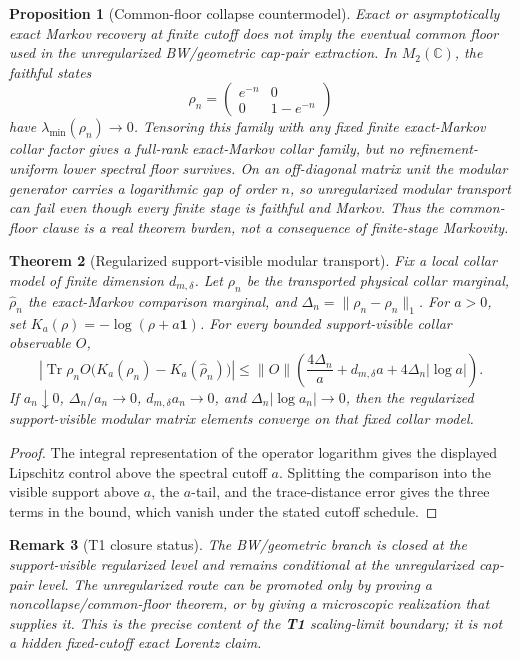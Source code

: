 \documentclass[11pt]{article}
\newtheorem{theorem}{Theorem}[section]
\newtheorem{proposition}[theorem]{Proposition}
\newtheorem{remark}[theorem]{Remark}
\begin{document}
\begin{proposition}[Common-floor collapse countermodel]\label{prop:commonfloor-collapse}
Exact or asymptotically exact Markov recovery at finite cutoff does not imply the eventual common floor used in the unregularized BW/geometric cap-pair extraction. In \(M_2(\mathbb C)\), the faithful states
\[
\rho_n=\begin{pmatrix}e^{-n}&0\\0&1-e^{-n}\end{pmatrix}
\]
have \(\lambda_{\min}(\rho_n)\to0\). Tensoring this family with any fixed finite exact-Markov collar factor gives a full-rank exact-Markov collar family, but no refinement-uniform lower spectral floor survives. On an off-diagonal matrix unit the modular generator carries a logarithmic gap of order \(n\), so unregularized modular transport can fail even though every finite stage is faithful and Markov. Thus the common-floor clause is a real theorem burden, not a consequence of finite-stage Markovity.
\end{proposition}

\begin{theorem}[Regularized support-visible modular transport]\label{thm:regularized-modular-transport}
Fix a local collar model of finite dimension \(d_{m,\delta}\). Let \(\rho_n\) be the transported physical collar marginal, \(\widehat\rho_n\) the exact-Markov comparison marginal, and \(\Delta_n=\|\rho_n-\widehat\rho_n\|_1\). For \(a>0\), set \(K_a(\rho)=-\log(\rho+a\mathbf 1)\). For every bounded support-visible collar observable \(O\),
\[
\left|\operatorname{Tr}\rho_n O\bigl(K_a(\rho_n)-K_a(\widehat\rho_n)\bigr)\right|
\le
\|O\|\left(\frac{4\Delta_n}{a}+d_{m,\delta}a+4\Delta_n|\log a|\right).
\]
If \(a_n\downarrow0\), \(\Delta_n/a_n\to0\), \(d_{m,\delta}a_n\to0\), and \(\Delta_n|\log a_n|\to0\), then the regularized support-visible modular matrix elements converge on that fixed collar model.
\end{theorem}

\begin{proof}
The integral representation of the operator logarithm gives the displayed Lipschitz control above the spectral cutoff \(a\). Splitting the comparison into the visible support above \(a\), the \(a\)-tail, and the trace-distance error gives the three terms in the bound, which vanish under the stated cutoff schedule.
\end{proof}

\begin{remark}[T1 closure status]
The BW/geometric branch is closed at the support-visible regularized level and remains conditional at the unregularized cap-pair level. The unregularized route can be promoted only by proving a noncollapse/common-floor theorem, or by giving a microscopic realization that supplies it. This is the precise content of the \textbf{T1} scaling-limit boundary; it is not a hidden fixed-cutoff exact Lorentz claim.
\end{remark}
\end{document}

